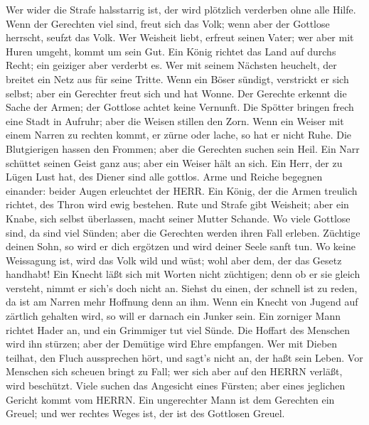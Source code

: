  Wer wider die Strafe halsstarrig ist, der wird plötzlich
verderben ohne alle Hilfe.  Wenn der Gerechten viel sind,
freut sich das Volk; wenn aber der Gottlose herrscht, seufzt das Volk.
 Wer Weisheit liebt, erfreut seinen Vater; wer aber mit
Huren umgeht, kommt um sein Gut.  Ein König richtet das Land
auf durchs Recht; ein geiziger aber verderbt es.  Wer mit
seinem Nächsten heuchelt, der breitet ein Netz aus für seine Tritte.
 Wenn ein Böser sündigt, verstrickt er sich selbst; aber ein
Gerechter freut sich und hat Wonne.  Der Gerechte erkennt
die Sache der Armen; der Gottlose achtet keine Vernunft. 
Die Spötter bringen frech eine Stadt in Aufruhr; aber die Weisen stillen
den Zorn.  Wenn ein Weiser mit einem Narren zu rechten
kommt, er zürne oder lache, so hat er nicht Ruhe.  Die
Blutgierigen hassen den Frommen; aber die Gerechten suchen sein Heil.
 Ein Narr schüttet seinen Geist ganz aus; aber ein Weiser
hält an sich.  Ein Herr, der zu Lügen Lust hat, des Diener
sind alle gottlos.  Arme und Reiche begegnen einander:
beider Augen erleuchtet der HERR.  Ein König, der die Armen
treulich richtet, des Thron wird ewig bestehen.  Rute und
Strafe gibt Weisheit; aber ein Knabe, sich selbst überlassen, macht
seiner Mutter Schande.  Wo viele Gottlose sind, da sind
viel Sünden; aber die Gerechten werden ihren Fall erleben. 
Züchtige deinen Sohn, so wird er dich ergötzen und wird deiner Seele
sanft tun.  Wo keine Weissagung ist, wird das Volk wild und
wüst; wohl aber dem, der das Gesetz handhabt!  Ein Knecht
läßt sich mit Worten nicht züchtigen; denn ob er sie gleich versteht,
nimmt er sich's doch nicht an.  Siehst du einen, der
schnell ist zu reden, da ist am Narren mehr Hoffnung denn an ihm.
 Wenn ein Knecht von Jugend auf zärtlich gehalten wird, so
will er darnach ein Junker sein.  Ein zorniger Mann richtet
Hader an, und ein Grimmiger tut viel Sünde.  Die Hoffart
des Menschen wird ihn stürzen; aber der Demütige wird Ehre empfangen.
 Wer mit Dieben teilhat, den Fluch aussprechen hört, und
sagt's nicht an, der haßt sein Leben.  Vor Menschen sich
scheuen bringt zu Fall; wer sich aber auf den HERRN verläßt, wird
beschützt.  Viele suchen das Angesicht eines Fürsten; aber
eines jeglichen Gericht kommt vom HERRN.  Ein ungerechter
Mann ist dem Gerechten ein Greuel; und wer rechtes Weges ist, der ist
des Gottlosen Greuel.

